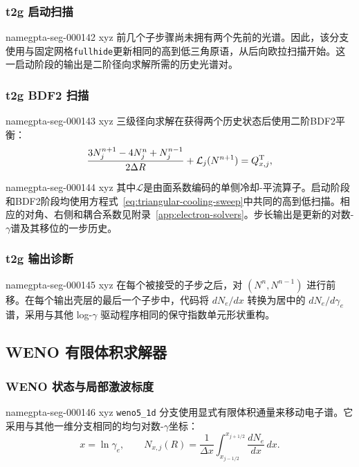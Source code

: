 \documentclass[twocolumn]{aastex702}
\makeatletter
\providecommand{\gptareaderanchor}[1]{\pdfdest name{#1} xyz}%
\providecommand{\gptareaderanchor}[1]{\special{pdf:dest (#1) [ @thispage /XYZ @xpos @ypos null ]}}%
\makeatother
\begin{document}
\subsubsection{t2g 启动扫描}


\gptareaderanchor{gpta-seg-000142}%
前几个子步骤尚未拥有两个先前的光谱。因此，该分支使用与固定网格\texttt{fullhide}更新相同的高到低三角原语，从后向欧拉扫描开始。这一启动阶段的输出是二阶径向求解所需的历史光谱对。

\subsubsection{t2g BDF2 扫描}


\gptareaderanchor{gpta-seg-000143}%
三级径向求解在获得两个历史状态后使用二阶BDF2平衡：
\begin{equation}
\frac{3N_j^{n+1}-4N_j^n+N_j^{n-1}}{2\Delta R}
+\mathcal{L}_j(N^{n+1})=Q_{x,j}^{\rm T},
\end{equation}

\gptareaderanchor{gpta-seg-000144}%
其中\(\mathcal{L}\)是由面系数编码的单侧冷却-平流算子。启动阶段和BDF2阶段均使用方程式~\eqref{eq:triangular-cooling-sweep}中共同的高到低扫描。相应的对角、右侧和耦合系数见附录~\ref{app:electron-solvers}。步长输出是更新的对数-\(\gamma\)谱及其移位的一步历史。

\subsubsection{t2g 输出诊断}


\gptareaderanchor{gpta-seg-000145}%
在每个被接受的子步之后，对 \((N^n,N^{n-1})\) 进行前移。在每个输出壳层的最后一个子步中，代码将 \(dN_e/dx\) 转换为居中的 \(dN_e/d\gamma_e\) 谱，采用与其他 log-\(\gamma\) 驱动程序相同的保守指数单元形状重构。

\subsection{WENO 有限体积求解器}

\subsubsection{WENO 状态与局部激波标度}


\gptareaderanchor{gpta-seg-000146}%
\texttt{weno5\_1d} 分支使用显式有限体积通量来移动电子谱。它采用与其他一维分支相同的均匀对数-\(\gamma\)坐标：
\begin{equation}
x=\ln\gamma_e,\qquad
N_{x,j}(R)=\frac{1}{\Delta x}
\int_{x_{j-1/2}}^{x_{j+1/2}}\frac{dN_e}{dx}\,dx .
\end{equation}
\end{document}
